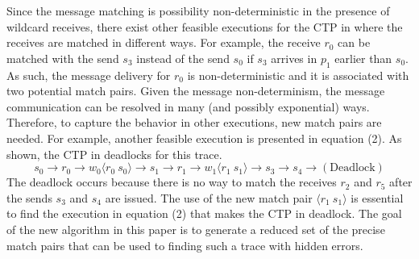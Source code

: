 
Since the message matching is possibility non-deterministic in the presence of wildcard receives, there exist other feasible executions for the CTP in  where the receives are matched in different ways. For example,  the receive $r_0$ can be matched with the send $s_3$ instead of the send $s_0$ if $s_3$ arrives in $p_1$ earlier than $s_0$. As such, the message delivery for $r_0$ is non-deterministic and it is associated with two potential match pairs. 
Given the message non-determinism, the message communication can be resolved in many (and possibly exponential) ways. 
Therefore, to capture the behavior in other executions, new match pairs are needed.
For example, another feasible execution is presented in equation (2). As shown, the CTP in  deadlocks for this trace. 
\begin{equation}
s_0\rightarrow r_0\rightarrow w_0\langle r_0\ s_0\rangle \rightarrow s_1\rightarrow r_1\rightarrow w_1\langle r_1\ s_1\rangle \rightarrow s_3\rightarrow s_4 \rightarrow (\mathrm{Deadlock})
\end{equation} 
The deadlock occurs because there is no way to match the receives $r_2$ and $r_5$ after the sends $s_3$ and $s_4$ are issued. The use of the new match pair $\langle r_1\ s_1\rangle$ is essential to find the execution in equation (2) that makes the CTP in  deadlock.
The goal of the new algorithm in this paper is to generate a reduced set of the precise match pairs that can be used to finding such a trace with hidden errors.

